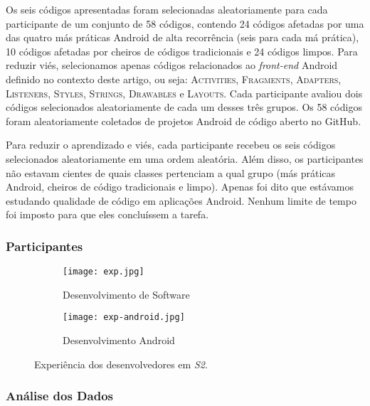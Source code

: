 Os seis códigos apresentadas foram selecionadas aleatoriamente para cada participante de um conjunto de 58 códigos, contendo 24 códigos afetadas por uma das quatro más práticas Android de alta recorrência (seis para cada má prática), 10 códigos afetadas por cheiros de códigos tradicionais e 24 códigos limpos. Para reduzir viés, selecionamos apenas códigos relacionados ao \textit{front-end} Android definido no contexto deste artigo, ou seja: \textsc{Activities}, \textsc{Fragments}, \textsc{Adapters}, \textsc{Listeners}, \textsc{Styles}, \textsc{Strings}, \textsc{Drawables} e \textsc{Layouts}. Cada participante avaliou dois códigos selecionados aleatoriamente de cada um desses três grupos. Os 58 códigos foram aleatoriamente coletados de projetos Android de código aberto no GitHub.

Para reduzir o aprendizado e viés, cada participante recebeu os seis códigos selecionados aleatoriamente em uma ordem aleatória. Além disso, os participantes não estavam cientes de quais classes pertenciam a qual grupo (más práticas Android, cheiros de código tradicionais e limpo). Apenas foi dito que estávamos estudando qualidade de código em aplicações Android. Nenhum limite de tempo foi imposto para que eles concluíssem a tarefa.

\subsubsection{Participantes}
\label{sub:perception-participants}

\begin{figure*}
\centering
\begin{subfigure}{.5\textwidth}
  \centering
  \texttt{[image: exp.jpg]}
  \caption{Desenvolvimento de Software}
  \label{fig:sub1}
\end{subfigure}%
\begin{subfigure}{.5\textwidth}
  \centering
  \texttt{[image: exp-android.jpg]}
  \caption{Desenvolvimento Android}
  \label{fig:sub2}
\end{subfigure}
\caption{Experiência dos desenvolvedores em \textit{S2}.}
\label{fig:survey2-exp}
\end{figure*}


\subsubsection{Análise dos Dados}
\label{sub:perception-participants-analysis}

